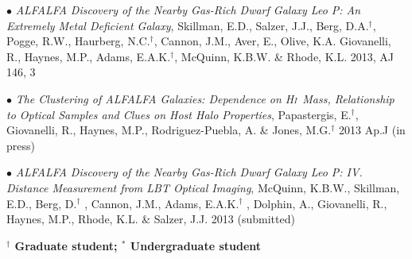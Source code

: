 \documentclass[11pt]{article}
\newcommand{\HI}{H\textsc{i}}
\begin{document}
$\bullet$ \hskip 3pt {\it ALFALFA Discovery of the Nearby Gas-Rich Dwarf Galaxy Leo P: An Extremely Metal Deficient Galaxy},
Skillman, E.D., Salzer, J.J., Berg, D.A.$^\dagger$, Pogge, R.W., Haurberg, N.C.$^\dagger$, Cannon, J.M.,
Aver, E., Olive, K.A. Giovanelli, R., Haynes, M.P., Adams, E.A.K.$^\dagger$, McQuinn, K.B.W. \& Rhode, K.L.
2013, AJ 146, 3

$\bullet$ \hskip 3pt {\it The Clustering of ALFALFA Galaxies: Dependence on \HI\ Mass, Relationship to Optical Samples
and Clues on Host Halo Properties},
Papastergis, E.$^\dagger$, Giovanelli, R., Haynes,
   M.P., Rodriguez-Puebla, A. \& Jones, M.G.$^\dagger$ 2013 Ap.J (in press)

$\bullet$ \hskip 3pt {\it ALFALFA Discovery of the Nearby Gas-Rich Dwarf Galaxy Leo P: IV. Distance Measurement from LBT Optical Imaging},
McQuinn, K.B.W., Skillman, E.D., Berg, D.$^\dagger$ , Cannon, J.M., Adams,
E.A.K.$^\dagger$ , Dolphin, A., Giovanelli, R., Haynes, M.P., Rhode, K.L. \&
Salzer, J.J. 2013 (submitted)

\vskip 5pt {\bf $^\dagger$ Graduate student; $^*$ Undergraduate student}
\end{document}

